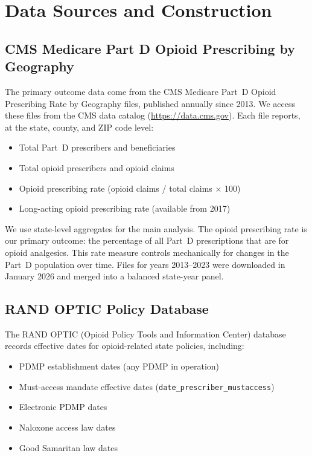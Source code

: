 \documentclass[12pt]{article}
\begin{document}
\section{Data Sources and Construction}\label{app:data}

\subsection{CMS Medicare Part D Opioid Prescribing by Geography}

The primary outcome data come from the CMS Medicare Part~D Opioid Prescribing Rate by Geography files, published annually since 2013. We access these files from the CMS data catalog (\url{https://data.cms.gov}). Each file reports, at the state, county, and ZIP code level:

\begin{itemize}
\item Total Part~D prescribers and beneficiaries
\item Total opioid prescribers and opioid claims
\item Opioid prescribing rate (opioid claims / total claims $\times$ 100)
\item Long-acting opioid prescribing rate (available from 2017)
\end{itemize}

We use state-level aggregates for the main analysis. The opioid prescribing rate is our primary outcome: the percentage of all Part~D prescriptions that are for opioid analgesics. This rate measure controls mechanically for changes in the Part~D population over time. Files for years 2013--2023 were downloaded in January 2026 and merged into a balanced state-year panel.

\subsection{RAND OPTIC Policy Database}

The RAND OPTIC (Opioid Policy Tools and Information Center) database records effective dates for opioid-related state policies, including:

\begin{itemize}
\item PDMP establishment dates (any PDMP in operation)
\item Must-access mandate effective dates (\texttt{date\_prescriber\_mustaccess})
\item Electronic PDMP dates
\item Naloxone access law dates
\item Good Samaritan law dates
\end{itemize}
\end{document}

